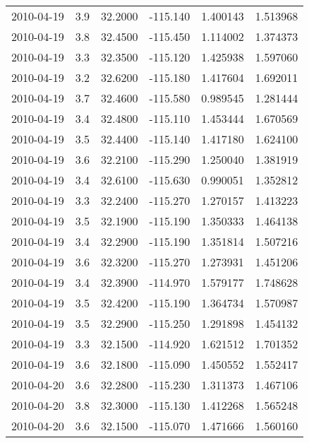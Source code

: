 \begin{tabular}{lrrrrr}
2010-04-19 &       3.9 &  32.2000 &  -115.140 &         1.400143 &         1.513968 \\
2010-04-19 &       3.8 &  32.4500 &  -115.450 &         1.114002 &         1.374373 \\
2010-04-19 &       3.3 &  32.3500 &  -115.120 &         1.425938 &         1.597060 \\
2010-04-19 &       3.2 &  32.6200 &  -115.180 &         1.417604 &         1.692011 \\
2010-04-19 &       3.7 &  32.4600 &  -115.580 &         0.989545 &         1.281444 \\
2010-04-19 &       3.4 &  32.4800 &  -115.110 &         1.453444 &         1.670569 \\
2010-04-19 &       3.5 &  32.4400 &  -115.140 &         1.417180 &         1.624100 \\
2010-04-19 &       3.6 &  32.2100 &  -115.290 &         1.250040 &         1.381919 \\
2010-04-19 &       3.4 &  32.6100 &  -115.630 &         0.990051 &         1.352812 \\
2010-04-19 &       3.3 &  32.2400 &  -115.270 &         1.270157 &         1.413223 \\
2010-04-19 &       3.5 &  32.1900 &  -115.190 &         1.350333 &         1.464138 \\
2010-04-19 &       3.4 &  32.2900 &  -115.190 &         1.351814 &         1.507216 \\
2010-04-19 &       3.6 &  32.3200 &  -115.270 &         1.273931 &         1.451206 \\
2010-04-19 &       3.4 &  32.3900 &  -114.970 &         1.579177 &         1.748628 \\
2010-04-19 &       3.5 &  32.4200 &  -115.190 &         1.364734 &         1.570987 \\
2010-04-19 &       3.5 &  32.2900 &  -115.250 &         1.291898 &         1.454132 \\
2010-04-19 &       3.3 &  32.1500 &  -114.920 &         1.621512 &         1.701352 \\
2010-04-19 &       3.6 &  32.1800 &  -115.090 &         1.450552 &         1.552417 \\
2010-04-20 &       3.6 &  32.2800 &  -115.230 &         1.311373 &         1.467106 \\
2010-04-20 &       3.8 &  32.3000 &  -115.130 &         1.412268 &         1.565248 \\
2010-04-20 &       3.6 &  32.1500 &  -115.070 &         1.471666 &         1.560160 \\

\end{tabular}
